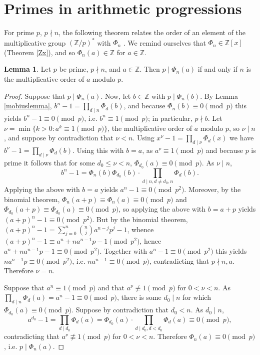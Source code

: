 \documentclass{article}
\theoremstyle{definition}
\newtheorem{lemma}[theorem]{Lemma}
\theoremstyle{definition}
\begin{document}
\section{Primes in arithmetic progressions}
For prime $p$, $p \nmid n$, the following theorem
relates the order of an element of the multiplicative group $(\mathbb{Z}/p)^*$ 
with $\Phi_n$ \cite[p.~13, Lemma 2.9]{washington}.
We remind ourselves that $\Phi_n \in \mathbb{Z}[x]$ (Theorem \ref{Zx}), and so
$\Phi_n(a) \in \mathbb{Z}$ for $a \in \mathbb{Z}$.

\begin{lemma}
Let $p$ be prime, $p  \nmid n$, and $a \in \mathbb{Z}$. Then $p \mid \Phi_n(a)$ if and only if
$n$ is the multiplicative order of $a$ modulo $p$.
\label{multiplicativeorder}
\end{lemma}
\begin{proof}
Suppose that $p \mid \Phi_n(a)$. Now, let
$b \in \mathbb{Z}$ with 
 $p \mid \Phi_n(b)$. By Lemma \ref{mobiuslemma}, 
$b^n-1 = \prod_{d \mid n} \Phi_d(b)$,
and because $\Phi_n(b) \equiv 0 \pmod{p}$ this yields
$b^n-1 \equiv 0 \pmod{p}$, i.e. $b^n \equiv 1 \pmod{p}$; in particular, $p \nmid b$.
Let $\nu = \min \{k > 0: a^k \equiv 1 \pmod{p}\}$, the multiplicative order of $a$ modulo $p$, so $\nu \mid n$, and
suppose by contradiction that $\nu<n$. Using $x^\nu - 1 = \prod_{d \mid \nu} \Phi_d(x)$ we have
$b^\nu - 1 = \prod_{d \mid \nu} \Phi_d(b)$.
Using this with $b=a$, as $a^\nu \equiv 1 \pmod{p}$ and because $p$ is prime it follows
that for some $d_0 \leq \nu < n$, $\Phi_{d_0}(a) \equiv 0 \pmod{p}$. As $\nu \mid n$, 
\[
b^n-1 = \Phi_n(b) \Phi_{d_0}(b)  \cdot \prod_{d \mid n, d \neq d_0, n} \Phi_d(b).
\]
Applying the above with $b=a$ yields $a^n-1 \equiv 0 \pmod{p^2}$. 
Moreover, by the binomial theorem, $\Phi_n(a+p) \equiv \Phi_n(a) \equiv 0 \pmod{p}$ and
$\Phi_{d_0}(a+p) \equiv \Phi_{d_0}(a) \equiv 0 \pmod{p}$, so applying the above with $b=a+p$ yields
$(a+p)^n - 1 \equiv 0 \pmod{p^2}$.
But by the binomial theorem, $(a+p)^n -1 = \sum_{j=0}^n \binom{n}{j} a^{n-j} p^j - 1$, whence
$(a+p)^n - 1 \equiv a^n + na^{n-1}p - 1 \pmod{p^2}$,
hence $a^n + na^{n-1}p -1 \equiv 0 \pmod{p^2}$.
Together with $a^n-1 \equiv 0 \pmod{p^2}$ this yields
$na^{n-1}p \equiv 0 \pmod{p^2}$, i.e. $na^{n-1} \equiv 0 \pmod{p}$, contradicting that $p \nmid n, a$. 
Therefore $\nu = n$.

Suppose that $a^n \equiv 1 \pmod{p}$ and that $a^\nu \not \equiv 1 \pmod{p}$ for $0<\nu<n$. 
As $ \prod_{d \mid n} \Phi_d(a) = a^n - 1 \equiv 0 \pmod{p}$, 
there is some $d_0 \mid n$ for which $\Phi_{d_0}(a) \equiv 0 \pmod{p}$. Suppose by contradiction that
$d_0<n$. As $d_0 \mid n$,
\[
a^{d_0}-1 = \prod_{d \mid d_0} \Phi_d(a) = \Phi_{d_0}(a) \cdot \prod_{d \mid d_0, d<d_0} \Phi_d(a) \equiv 0 \pmod{p},
\]
contradicting that $a^\nu \not \equiv 1 \pmod{p}$ for $0<\nu<n$. Therefore $\Phi_n(a) \equiv 0 \pmod{p}$, i.e.
$p \mid \Phi_n(a)$.
\end{proof}
\end{document}
